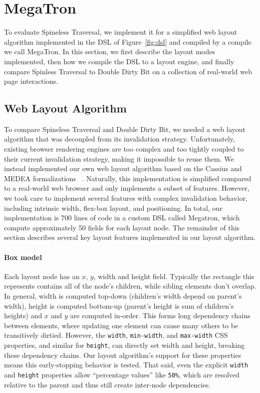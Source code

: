 \section{MegaTron}

To evaluate Spineless Traversal,
  we implement it for a simplified web layout algorithm
  implemented in the DSL of Figure~\ref{fig:dsl}
  and compiled by a compile we call MegaTron.
In this section, we first describe
  the layout modes implemented,
  then how we compile the DSL to a layout engine,
  and finally compare Spinless Traversal to Double Dirty Bit
  on a collection of real-world web page interactions.

\subsection{Web Layout Algorithm}
\label{sec:layout-impl}

To compare Spineless Traversal and Double Dirty Bit,
  we needed a web layout algorithm
  that was decoupled from its invalidation strategy.
Unfortunately, existing browser rendering engines
  are too complex and too tightly coupled
  to their current invalidation strategy,
  making it impossible to reuse them.
We instead implemented our own web layout algorithm
  based on the Cassius and MEDEA formalizations%
  ~\cite{cassius-1,cassius-2,yufeng-2}.
Naturally, this implementation is simplified
  compared to a real-world web browser
  and only implements a subset of features.
However, we took care to implement several features
  with complex invalidation behavior,
  including intrinsic width, flex-box layout, and positioning.
In total, our implementation is 700 lines of code
  in a custom DSL called Megatron,
  which compute approximately 50 fields for each layout node.
The remainder of this section describes
  several key layout features implemented in our layout algorithm.

\paragraph{Box model}
Each layout node has an $x$, $y$, width and height field.
Typically the rectangle this represents contains
    all of the node's children, while sibling elements
    don't overlap.
In general, width is computed top-down
  (children's width depend on parent's width),
  height is computed bottom-up
  (parent's height is sum of children's heights)
  and $x$ and $y$ are computed in-order.
This forms long dependency chains between elements,
    where updating one element can cause many others
    to be transitively dirtied.
However, the \texttt{width},
    \texttt{min-width}, and \texttt{max-width} CSS properties,
    and similar for \texttt{height},
    can directly set width and height,
    breaking these dependency chains.
Our layout algorithm's support for these properties
    means this early-stopping behavior is tested.
That said, even the
  explicit \texttt{width} and \texttt{height} properties
  allow ``percentage values'' like \texttt{50\%},
  which are resolved relative to the parent and thus
  still create inter-node dependencies.
	
